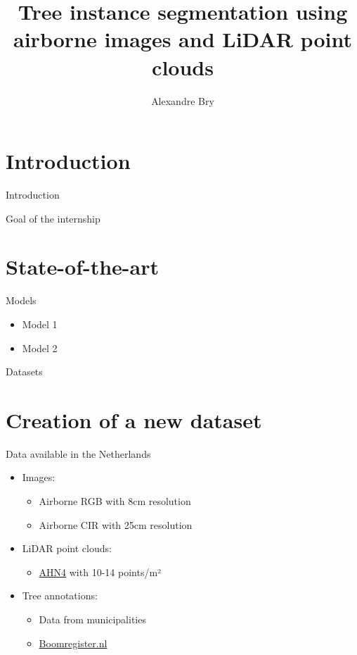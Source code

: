 \documentclass[
  ignorenonframetext,
]{beamer}
\title{Tree instance segmentation using airborne images and LiDAR point
clouds}
\author{Alexandre Bry}
\date{}
\providecommand{\tightlist}{%
  \setlength{\itemsep}{0pt}\setlength{\parskip}{0pt}}\usepackage{longtable,booktabs,array}
\begin{document}
\frame{\titlepage}


\section{Introduction}\label{introduction}

\begin{frame}{Introduction}
\end{frame}

\begin{frame}{Goal of the internship}
\label{goal-of-the-internship}
\end{frame}

\section{State-of-the-art}\label{state-of-the-art}

\begin{frame}{Models}
\label{models}
\begin{itemize}[<+->]
\tightlist
\item
  Model 1
\item
  Model 2
\end{itemize}
\end{frame}

\begin{frame}{Datasets}
\label{datasets}
\end{frame}

\section{Creation of a new dataset}\label{creation-of-a-new-dataset}

\begin{frame}{Data available in the Netherlands}
\label{data-available-in-the-netherlands}
\begin{itemize}[<+->]
\tightlist
\item
  Images:

  \begin{itemize}[<+->]
  \tightlist
  \item
    Airborne RGB with 8cm resolution
  \item
    Airborne CIR with 25cm resolution
  \end{itemize}
\item
  LiDAR point clouds:

  \begin{itemize}[<+->]
  \tightlist
  \item
    \href{https://www.ahn.nl/}{AHN4} with 10-14 points/m²
  \end{itemize}
\item
  Tree annotations:

  \begin{itemize}[<+->]
  \tightlist
  \item
    Data from municipalities
  \item
    \href{https://boomregister.nl/}{Boomregister.nl}
  \end{itemize}
\end{itemize}
\end{frame}
\end{document}
